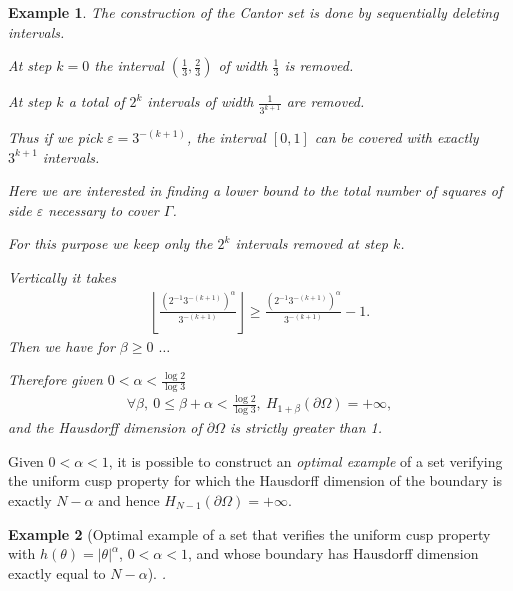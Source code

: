 \documentclass{book}
\numberwithin{equation}{section}
\newtheorem{example}{Example}[section]
\begin{document}
\begin{enumerate}
\begin{example}
        The construction of the Cantor set is done by sequentially deleting intervals.
        
        At step $k = 0$ the interval $\left(\frac{1}{3},\frac{2}{3}\right)$ of width $\frac{1}{3}$ is removed.
        
        At step $k$ a total of $2^k$ intervals of width $\frac{1}{3^{k+1}}$ are removed.
        
        Thus if we pick $\varepsilon = 3^{-(k+1)}$, the interval $[0,1]$ can be covered with exactly $3^{k+1}$ intervals.
        
        Here we are interested in finding a lower bound to the total number of squares of side $\varepsilon$ necessary to cover $\Gamma$.
        
        For this purpose we keep only the $2^k$ intervals removed at step $k$.
        
        Vertically it takes
        \begin{align*}
            \left\lfloor\frac{\left(2^{-1}3^{-(k+1)}\right)^\alpha}{3^{-(k+1)}}\right\rfloor\ge\frac{\left(2^{-1}3^{-(k+1)}\right)^\alpha}{3^{-(k+1)}}
            - 1.
        \end{align*}
        Then we have for $\beta\ge 0$ \cite[p. 119]{Delfour_Zolesio2011} $\ldots$
        
        Therefore given $0 < \alpha < \frac{\log 2}{\log 3}$
        \begin{align*}
            \forall\beta,\ 0\le\beta + \alpha < \frac{\log 2}{\log 3},\ H_{1 + \beta}(\partial\Omega) = +\infty,
        \end{align*}
        and the Hausdorff dimension of $\partial\Omega$ is strictly greater than 1.
    \end{example}

    Given $0 < \alpha < 1$, it is possible to construct an \textit{optimal example} of a set verifying the uniform cusp property for which the Hausdorff dimension of the boundary is exactly $N - \alpha$ and hence $H_{N - 1}(\partial\Omega) = +\infty$.
    
    \begin{example}[Optimal example of a set that verifies the uniform cusp property with $h(\theta) = |\theta|^\alpha$, $0 < \alpha < 1$, and whose boundary has Hausdorff dimension exactly equal to $N - \alpha$] \cite[pp. 120--122]{Delfour_Zolesio2011}.        
    \end{example}
\end{enumerate}
\end{document}
